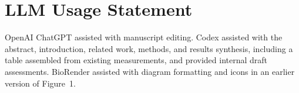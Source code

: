 \section*{LLM Usage Statement}
OpenAI ChatGPT assisted with manuscript editing. Codex assisted with the abstract, introduction, related
work, methods, and results synthesis, including a table assembled from existing
measurements, and provided internal draft assessments. BioRender assisted with diagram
formatting and icons in an earlier version of Figure~1. 